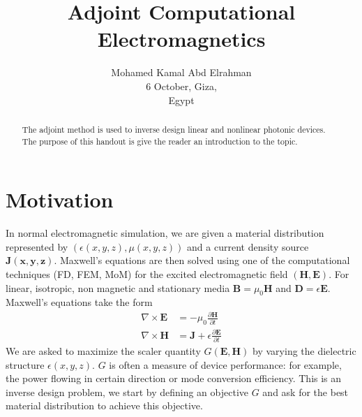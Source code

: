 \documentclass{tufte-handout}
\title{ Adjoint Computational Electromagnetics}
\author[mohamedkamal]{Mohamed Kamal Abd Elrahman \\
6 October, Giza,\\ Egypt}
\begin{document}
	\maketitle
	\begin{abstract}
		\noindent
		 The adjoint method is used to  inverse design linear and nonlinear photonic devices. The purpose of this handout is give the reader an introduction to the topic.   
	\end{abstract}

	\section{Motivation}
	In normal electromagnetic simulation, we are given a material distribution represented by $\left( \epsilon(x,y,z), \mu(x,y,z)\right)  $ and a current density source $\mathbf{J(x,y,z)}$. Maxwell's equations are then solved using one of the computational techniques (FD, FEM, MoM) for the excited electromagnetic field $(\mathbf{H},\mathbf{E})$. For linear, isotropic, non magnetic and stationary media  $\mathbf{B} = \mu_0 \mathbf{H}$ and $\mathbf{D} = \epsilon \mathbf{E}$. Maxwell's equations take the form 
	  \begin{subequations}
	  	\begin{align}
	  		\nabla \times \mathbf{E}  &= - \mu_0 \frac{\partial \mathbf{H}}{\partial t} \\
	    	\nabla \times \mathbf{H}  &= \mathbf{J} +  \epsilon \frac{\partial \mathbf{E}}{\partial t}
	  	\end{align}
	  \end{subequations}
 We are asked to maximize the scaler quantity $G(\mathbf{E},\mathbf{H})$ by varying the dielectric structure $\epsilon(x,y,z)$. $G$ is often a measure of device performance: for example, the power flowing in certain direction or mode conversion efficiency. This is an inverse design problem, we start by defining an objective $G$ and ask for the best material distribution  to achieve this objective. 
 
\end{document}
